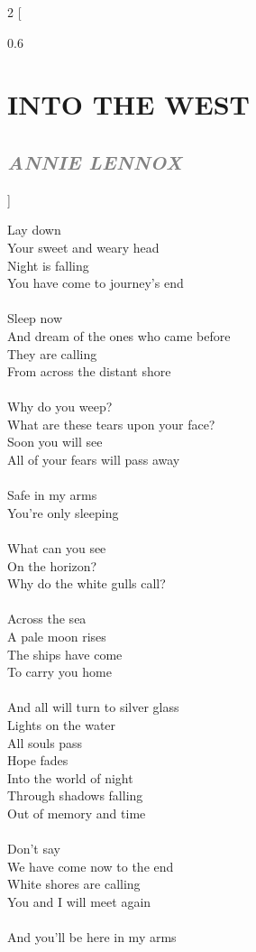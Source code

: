 \documentclass[100pt,a4paper]{report}
\newenvironment{song2}[2]
	{	
    	\begin{multicols*}{2}
		[
			\begin{spacing}{0.6}
				\section*{\LARGE\centering \MakeUppercase{\textbf{{#1}}}}
				\subsection*{\Large\centering \textit{\textcolor{gray}{\MakeUppercase{{#2}}}}}
			\end{spacing}
		]
		\Large
	}
	{
	\end{multicols*}
	\newpage
    }
\begin{document}
\begin{song2}{Into the West}{Annie Lennox}
\noindent
Lay down\\
Your sweet and weary head\\
Night is falling\\
You have come to journey's end\\
\\
Sleep now\\
And dream of the ones who came before\\
They are calling\\
From across the distant shore\\
\\
Why do you weep?\\
What are these tears upon your face?\\
Soon you will see\\
All of your fears will pass away\\
\\
Safe in my arms\\
You're only sleeping\\
\\
What can you see\\
On the horizon?\\
Why do the white gulls call?\\
\\
Across the sea\\
A pale moon rises\\
The ships have come\\
To carry you home\\
\\
And all will turn to silver glass\\
Lights on the water\\
All souls pass\\
\vfill
\columnbreak
\noindent
Hope fades\\
Into the world of night\\
Through shadows falling\\
Out of memory and time\\
\\
Don't say\\
We have come now to the end\\
White shores are calling\\
You and I will meet again\\
\\
And you'll be here in my arms\\

\end{song2}
\end{document}
